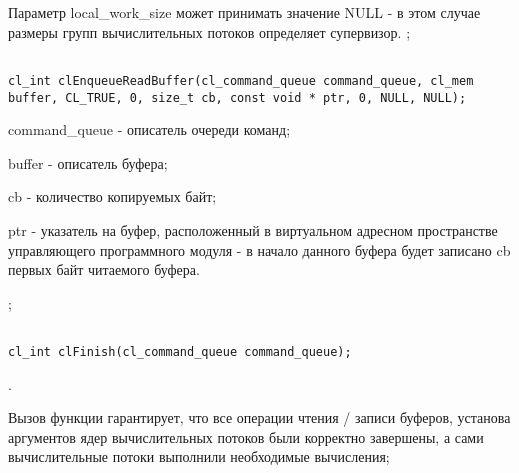 \begin{enumerate}
\begin{enumerate}
{						Параметр local\_work\_size может принимать значение NULL - в этом случае размеры групп вычислительных потоков определяет супервизор.
				}
				{\openclsuccess;}


			\end{enumerate}



\begin{lstlisting}

cl_int clEnqueueReadBuffer(cl_command_queue command_queue, cl_mem buffer, CL_TRUE, 0, size_t cb, const void * ptr, 0, NULL, NULL);

\end{lstlisting}

		\openclend
		{
			\item command\_queue - описатель очереди команд;
			\item buffer - описатель буфера;
			\item cb - количество копируемых байт;
			\item ptr - указатель на буфер, расположенный в виртуальном адресном пространстве управляющего программного модуля - в начало данного буфера будет записано cb первых байт читаемого буфера.
		}
		{\openclsuccess;}



\begin{lstlisting}

cl_int clFinish(cl_command_queue command_queue);

\end{lstlisting}

		{
		\openclsuccessfinish.

		Вызов функции \openclfunc гарантирует, что все операции чтения / записи буферов, установа аргументов ядер вычислительных потоков были корректно завершены, а сами вычислительные потоки выполнили необходимые вычисления;
		}


\end{enumerate}
